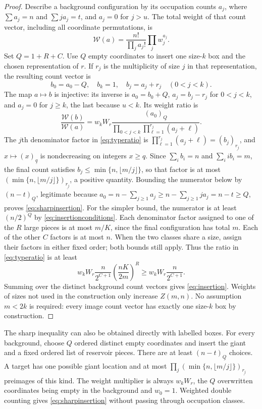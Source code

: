 \documentclass[11pt]{amsart}
\theoremstyle{remark}\newtheorem{remark}[theorem]{Remark}
\newcommand{\fall}[2]{(#1)_{\underline{#2}}}
\begin{document}
\begin{proof}
Describe a background configuration by its occupation counts $a_j$, where
$\sum a_j=n$ and $\sum j a_j=t$, and $a_j=0$ for $j>u$. The total weight of
that count vector, including all coordinate permutations, is
\[
 \mathcal W(a)=\frac{n!}{\prod_j a_j!}\prod_j w_j^{a_j}.
\]
Set $Q=1+R+C$. Use $Q$ empty coordinates to insert one size-$k$ box and the
chosen representation of $r$. If $r_j$ is the multiplicity of size $j$ in
that representation, the resulting count vector is
\[
 b_0=a_0-Q,\quad b_k=1,\quad b_j=a_j+r_j\quad(0<j<k).
\]
The map $a\mapsto b$ is injective: its inverse is $a_0=b_0+Q$,
$a_j=b_j-r_j$ for $0<j<k$, and $a_j=0$ for $j\ge k$, the last because $u<k$.
Its weight ratio is
\begin{equation}\label{eq:typeratio}
 \frac{\mathcal W(b)}{\mathcal W(a)}
 =w_kW_r\frac{\fall{a_0}{Q}}
 {\displaystyle\prod_{0<j<k}\prod_{\ell=1}^{r_j}(a_j+\ell)}.
\end{equation}
The $j$th denominator factor in \eqref{eq:typeratio} is
$\prod_{\ell=1}^{r_j}(a_j+\ell)=\fall{b_j}{r_j}$, and $x\mapsto\fall{x}{q}$ is
nondecreasing on integers $x\ge q$. Since $\sum_ib_i=n$ and $\sum_i ib_i=m$,
the final count satisfies $b_j\le\min\{n,\lfloor m/j\rfloor\}$, so that factor
is at most $\fall{\min\{n,\lfloor m/j\rfloor\}}{r_j}$, a positive quantity.
Bounding the numerator below by $\fall{n-t}{Q}$, legitimate because
$a_0=n-\sum_{j\ge1}a_j\ge n-\sum_{j\ge1}ja_j=n-t\ge Q$, proves
\eqref{eq:sharpinsertion}. For the simpler bound, the numerator is at
least $(n/2)^Q$ by \eqref{eq:insertionconditions}.
Each denominator factor assigned to one of the $R$ large pieces is at most
$m/K$, since the final configuration has total $m$. Each of the other $C$
factors is at most $n$. When the two classes share a size, assign their
factors in either fixed order; both bounds still apply. Thus the ratio in
\eqref{eq:typeratio} is at least
\[
 w_kW_r\frac{n}{2^{C+1}}
       \left(\frac{nK}{2m}\right)^R
 \ge w_kW_r\frac{n}{2^{C+1}}.
\]
Summing over the distinct background count vectors gives
\eqref{eq:insertion}. Weights of sizes not used in the construction only
increase $Z(m,n)$. No assumption $m<2k$ is required:
every image count vector has exactly one size-$k$ box by construction.
\end{proof}

The sharp inequality can also be obtained directly with labelled boxes.
For every background, choose $Q$ ordered distinct empty coordinates and
insert the giant and a fixed ordered list of reservoir pieces. There are
at least $\fall{n-t}{Q}$ choices. A target has one possible giant location
and at most
$\prod_j\fall{\min\{n,\lfloor m/j\rfloor\}}{r_j}$ preimages of this kind.
The weight multiplier is always $w_kW_r$, the $Q$ overwritten coordinates
being empty in the background and $w_0=1$. Weighted double counting gives
\eqref{eq:sharpinsertion} without passing through occupation classes.
\end{document}
